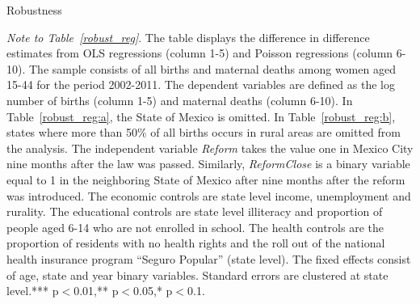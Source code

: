 \documentclass[a4paper, 11pt]{article}
\begin{document}
\begin{spacing}{1.4}
	\setcounter{table}{5}

 
  	\begin{table}\centering  \caption{Robustness} \label{robust_reg}
   	  			 
  		\begin{ThreePartTable}
  			
  			
  			\begin{subtable}{0.9\textwidth}\centering {}\label{robust_reg:a}
  				{\scriptsize 	}
  			\end{subtable}%
  			
  			\begin{subtable}{0.9\textwidth}\centering{}\label{robust_reg:b}
  				{\scriptsize 	}
  			\end{subtable}%
  			
  			\begin{tablenotes} 
  				\tiny \item \textit{Note to Table~\ref{robust_reg}}. The table displays the difference in difference estimates from OLS regressions (column 1-5) and Poisson regressions (column 6-10). The sample consists of all births and maternal deaths among women aged 15-44 for the period 2002-2011. The dependent variables are defined as the log number of births (column 1-5) and maternal deaths (column 6-10). In Table~\ref{robust_reg:a}, the State of Mexico is omitted. In Table~\ref{robust_reg:b}, states where more than 50\% of all births occurs in rural areas are omitted from the analysis. The independent variable \textit{Reform} takes the value one in Mexico City nine months after the law was passed. Similarly, \textit{ReformClose} is a binary variable equal to 1 in the neighboring State of Mexico after nine months after the reform was introduced. The economic controls are state level income, unemployment and rurality. The educational controls are state level illiteracy and proportion of people aged 6-14 who are not enrolled in school. The health controls are the proportion of residents with no health rights and the roll out of the national health insurance program ``Seguro Popular'' (state level). The fixed effects consist of age, state and year binary variables. Standard errors are clustered at state level.*** p$<$0.01,** p$<$0.05,* p$<$0.1.	 
  			\end{tablenotes} 

  		\end{ThreePartTable}
  	  			 

\end{table}
\end{spacing}
\end{document}
